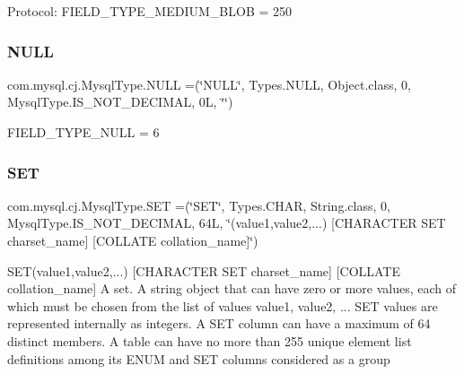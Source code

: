 Protocol\+: F\+I\+E\+L\+D\+\_\+\+T\+Y\+P\+E\+\_\+\+M\+E\+D\+I\+U\+M\+\_\+\+B\+L\+OB = 250 \mbox{\label{enumcom_1_1mysql_1_1cj_1_1_mysql_type_afd999a269aedd95acf6ae2453b95e2a3}} 
\subsubsection{\texorpdfstring{N\+U\+LL}{NULL}}
{\footnotesize\ttfamily com.\+mysql.\+cj.\+Mysql\+Type.\+N\+U\+LL =(\char`\"{}N\+U\+LL\char`\"{}, Types.\+N\+U\+LL, Object.\+class, 0, Mysql\+Type.\+I\+S\+\_\+\+N\+O\+T\+\_\+\+D\+E\+C\+I\+M\+AL, 0\+L, \char`\"{}\char`\"{})}

F\+I\+E\+L\+D\+\_\+\+T\+Y\+P\+E\+\_\+\+N\+U\+LL = 6 \mbox{\label{enumcom_1_1mysql_1_1cj_1_1_mysql_type_acf82f4d6ab19d38105ae67f3d1561c8e}} 
\subsubsection{\texorpdfstring{S\+ET}{SET}}
{\footnotesize\ttfamily com.\+mysql.\+cj.\+Mysql\+Type.\+S\+ET =(\char`\"{}S\+ET\char`\"{}, Types.\+C\+H\+AR, String.\+class, 0, Mysql\+Type.\+I\+S\+\_\+\+N\+O\+T\+\_\+\+D\+E\+C\+I\+M\+AL, 64\+L, \char`\"{}(\textquotesingle{}value1\textquotesingle{},\textquotesingle{}value2\textquotesingle{},...) \mbox{[}\+C\+H\+A\+R\+A\+C\+T\+E\+R S\+E\+T charset\+\_\+name\mbox{]} \mbox{[}\+C\+O\+L\+L\+A\+T\+E collation\+\_\+name\mbox{]}\char`\"{})}

S\+ET(\textquotesingle{}value1\textquotesingle{},\textquotesingle{}value2\textquotesingle{},...) \mbox{[}C\+H\+A\+R\+A\+C\+T\+ER S\+ET charset\+\_\+name\mbox{]} \mbox{[}C\+O\+L\+L\+A\+TE collation\+\_\+name\mbox{]} A set. A string object that can have zero or more values, each of which must be chosen from the list of values \textquotesingle{}value1\textquotesingle{}, \textquotesingle{}value2\textquotesingle{}, ... S\+ET values are represented internally as integers. A S\+ET column can have a maximum of 64 distinct members. A table can have no more than 255 unique element list definitions among its E\+N\+UM and S\+ET columns considered as a group

